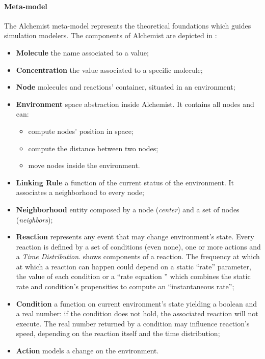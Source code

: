 \paragraph{Meta-model}
The Alchemist meta-model represents the theoretical foundations which guides
simulation modelers. The components of Alchemist are depicted in
:
%
%
\begin{itemize}
	\item \textbf{Molecule} the name associated to a value;
	\item \textbf{Concentration} the value associated to a specific molecule;
	\item \textbf{Node} molecules and reactions' container, situated in an
	      environment;
	\item \textbf{Environment} space abstraction inside Alchemist. It contains
	      all nodes and can:
	      \begin{itemize}
		      \item compute nodes' position in space;
		      \item compute the distance between two nodes;
		      \item move nodes inside the environment.
	      \end{itemize}
	\item \textbf{Linking Rule} a function of the current status of the
	      environment. It associates a neighborhood to every node;
	\item \textbf{Neighborhood} entity composed by a node (\emph{center}) and a
	      set of nodes (\emph{neighbors});
	\item \textbf{Reaction} represents any event that may change environment's
	      state. Every reaction is defined by a set of conditions (even none),
	      one or more actions and a \emph{Time Distribution}.
	       shows components of a reaction. The
	      frequency at which at which a reaction can happen could depend on a
	      static ``rate'' parameter, the value of each condition or a ``rate
	      equation '' which combines the static rate and condition's propensities
	      to compute an ``instantaneous rate'';
	\item \textbf{Condition} a function on current environment's state yielding
	      a boolean and a real number: if the condition does not hold, the
	      associated reaction will not execute. The real number returned by a
	      condition may influence reaction's speed, depending on the reaction
	      itself and the time distribution;
	\item \textbf{Action} models a change on the environment.
\end{itemize}
%
%
